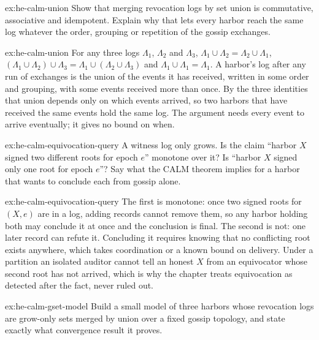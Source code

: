 \documentclass[11pt,a4paper]{article}
\theoremstyle{definition}
\theoremstyle{definition}
\theoremstyle{remark}
\begin{document}
\begin{pdexercise}[kind=Check,rating=1]{ex:he-calm-union}
Show that merging revocation logs by set union is commutative, associative
  and idempotent. Explain why that lets every harbor reach the same log
  whatever the order, grouping or repetition of the gossip exchanges.
\end{pdexercise}
\begin{pdsolution}{ex:he-calm-union}
For any three logs $\Lambda_1$, $\Lambda_2$ and $\Lambda_3$,
$\Lambda_1\cup\Lambda_2=\Lambda_2\cup\Lambda_1$,
$(\Lambda_1\cup\Lambda_2)\cup\Lambda_3=\Lambda_1\cup(\Lambda_2\cup\Lambda_3)$ and
$\Lambda_1\cup\Lambda_1=\Lambda_1$.
A harbor's log after any run of exchanges is the union of the events it has
received, written in some order and grouping, with some events received more
than once. By the three identities that union depends only on which events
arrived, so two harbors that have received the same events hold the same log.
The argument needs every event to arrive eventually; it gives no bound on when.
\end{pdsolution}
\begin{pdexercise}[kind=Check,rating=1]{ex:he-calm-equivocation-query}
A witness log only grows. Is the claim ``harbor $X$ signed two different roots
  for epoch $e$'' monotone over it? Is ``harbor $X$ signed only one root for
  epoch $e$''? Say what the CALM theorem implies for a harbor that wants to
  conclude each from gossip alone.
\end{pdexercise}
\begin{pdsolution}{ex:he-calm-equivocation-query}
The first is monotone: once two signed roots for $(X,e)$ are in a log, adding
records cannot remove them, so any harbor holding both may conclude it at once
and the conclusion is final. The second is not: one later record can refute
it. Concluding it requires knowing that no conflicting root exists anywhere,
which takes coordination or a known bound on delivery. Under a partition an
isolated auditor cannot tell an honest $X$ from an equivocator whose second
root has not arrived, which is why the chapter treats equivocation as detected
after the fact, never ruled out.
\end{pdsolution}
\begin{pdexercise}[kind=Open,rating=3]{ex:he-calm-gset-model}
Build a small model of three harbors whose revocation logs are grow-only sets
  merged by union over a fixed gossip topology, and state exactly what
  convergence result it proves.
\end{pdexercise}
\end{document}
